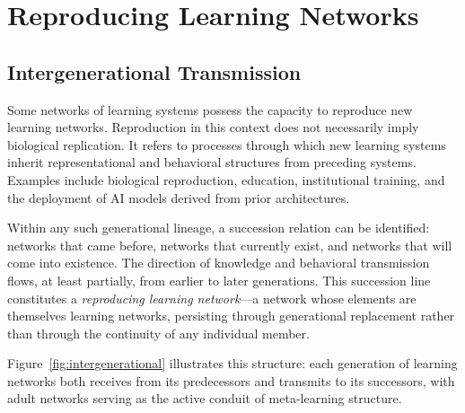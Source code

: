 \documentclass[11pt]{article}
\begin{document}
\section{Reproducing Learning Networks}

\subsection{Intergenerational Transmission}

Some networks of learning systems possess the capacity to reproduce new learning networks.
Reproduction in this context does not necessarily imply biological replication. It refers to
processes through which new learning systems inherit representational and behavioral
structures from preceding systems. Examples include biological reproduction, education,
institutional training, and the deployment of AI models derived from prior architectures.

Within any such generational lineage, a succession relation can be identified: networks that
came before, networks that currently exist, and networks that will come into existence. The
direction of knowledge and behavioral transmission flows, at least partially, from earlier to
later generations. This succession line constitutes a \emph{reproducing learning network}---a
network whose elements are themselves learning networks, persisting through generational
replacement rather than through the continuity of any individual member.

Figure~\ref{fig:intergenerational} illustrates this structure: each generation of learning
networks both receives from its predecessors and transmits to its successors, with adult
networks serving as the active conduit of meta-learning structure.
\end{document}
